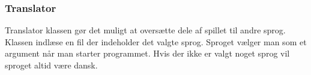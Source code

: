 \subsubsection{Translator}
Translator klassen gør det muligt at oversætte dele af spillet til andre sprog. Klassen indlæse en fil der indeholder det valgte sprog. Sproget vælger man som et argument når man starter programmet. Hvis der ikke er valgt noget sprog vil sproget altid være dansk.